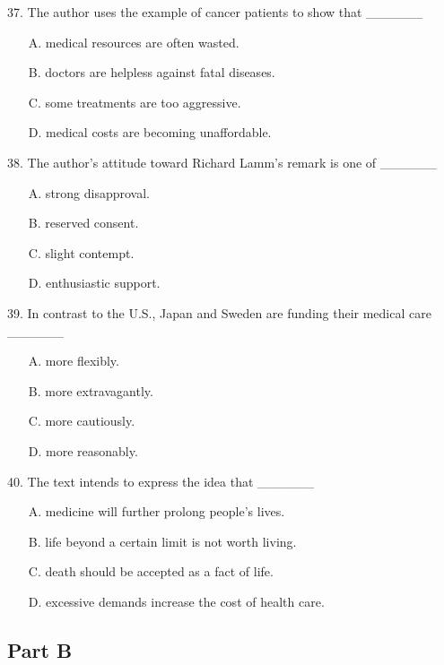 \documentclass[UTF8,11pt]{ctexart}
\begin{document}
37. The author uses the example of cancer patients to show that \_\_\_\_\_\_


\begin{itemize}[leftmargin=2em,itemsep=.2em,topsep=.4em]\item[A.] medical resources are often wasted.
\item[B.] doctors are helpless against fatal diseases.
\item[C.] some treatments are too aggressive.
\item[D.] medical costs are becoming unaffordable.
\end{itemize}

38. The author’s attitude toward Richard Lamm’s remark is one of \_\_\_\_\_\_


\begin{itemize}[leftmargin=2em,itemsep=.2em,topsep=.4em]\item[A.] strong disapproval.
\item[B.] reserved consent.
\item[C.] slight contempt.
\item[D.] enthusiastic support.
\end{itemize}

39. In contrast to the U.S., Japan and Sweden are funding their medical care \_\_\_\_\_\_


\begin{itemize}[leftmargin=2em,itemsep=.2em,topsep=.4em]\item[A.] more flexibly.
\item[B.] more extravagantly.
\item[C.] more cautiously.
\item[D.] more reasonably.
\end{itemize}

40. The text intends to express the idea that \_\_\_\_\_\_


\begin{itemize}[leftmargin=2em,itemsep=.2em,topsep=.4em]\item[A.] medicine will further prolong people’s lives.
\item[B.] life beyond a certain limit is not worth living.
\item[C.] death should be accepted as a fact of life.
\item[D.] excessive demands increase the cost of health care.
\end{itemize}

\subsection*{\textbf{Part B}}
\end{document}
